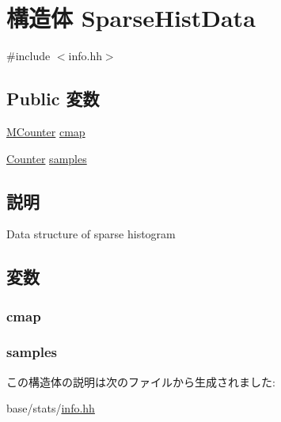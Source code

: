 \hypertarget{structStats_1_1SparseHistData}{
\section{構造体 SparseHistData}
\label{structStats_1_1SparseHistData}
}


{\ttfamily \#include $<$info.hh$>$}\subsection*{Public 変数}
\begin{DoxyCompactItemize}
\item 
\hyperlink{namespaceStats_a5a8433a643d3c7f0692fd273dcbe6423}{MCounter} \hyperlink{structStats_1_1SparseHistData_afc3dc68e80fbd8901da278bff71674e4}{cmap}
\item 
\hyperlink{namespaceStats_ac35128c026c72bb36af9cea00774e8a6}{Counter} \hyperlink{structStats_1_1SparseHistData_ab4db99aba3dd28686061dd3d5475b3bd}{samples}
\end{DoxyCompactItemize}


\subsection{説明}
Data structure of sparse histogram 

\subsection{変数}
\hypertarget{structStats_1_1SparseHistData_afc3dc68e80fbd8901da278bff71674e4}{
\subsubsection[{cmap}]{ {\bf cmap}}}
\label{structStats_1_1SparseHistData_afc3dc68e80fbd8901da278bff71674e4}
\hypertarget{structStats_1_1SparseHistData_ab4db99aba3dd28686061dd3d5475b3bd}{
\subsubsection[{samples}]{ {\bf samples}}}
\label{structStats_1_1SparseHistData_ab4db99aba3dd28686061dd3d5475b3bd}


この構造体の説明は次のファイルから生成されました:\begin{DoxyCompactItemize}
\item 
base/stats/\hyperlink{info_8hh}{info.hh}\end{DoxyCompactItemize}
